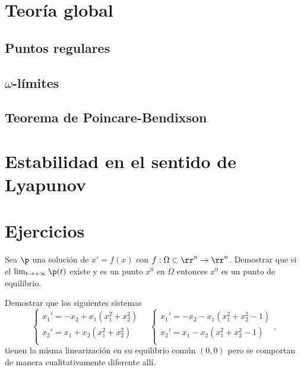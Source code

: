 \section{Teoría global}

\subsection{Puntos regulares}

\subsection{$\omega$-límites}

\subsection{Teorema de Poincare-Bendixson}

\section{Estabilidad en el sentido de Lyapunov}











\section*{Ejercicios}
\begin{ejercicio}\label{ejerptoequi} Sea $\p$ una solución de $x'=f(x)$ con
$f:\Omega\subset\rr^n\to\rr^n$. Demostrar que si el
$\lim_{t\to+\infty}\p(t)$ existe y es un punto $x^0$ en $\Omega$
entonces $x^0$ es un punto de equilibrio.
\end{ejercicio}

\begin{ejercicio}\label{linearizadocentro} Demostrar que los
siguientes sistemas
\[
    \left\{%
\begin{array}{l}
    x_1'=-x_2+x_1(x_1^2+x_2^2) \\
    x_2'=x_1+ x_2(x_1^2+x_2^2)\\
\end{array}
\right.\quad \left\{%
\begin{array}{l}
    x_1'=-x_2-x_1(x_1^2+x_2^2-1) \\
    x_2'=x_1-x_2(x_1^2+x_2^2-1)\\
\end{array} ,%
\right.
\]
tienen la  misma linearización en su equilibrio común $(0,0)$ pero
se comportan de manera cualitativamente diferente allí.
\end{ejercicio}

